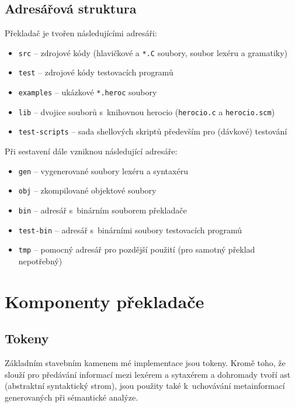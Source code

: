 \documentclass[a4paper,10pt]{article}
\begin{document}
\subsection{Adresářová struktura}
Překladač je tvořen následujícími adresáři:
\begin{itemize}
 \item \verb|src| -- zdrojové kódy (hlavičkové a \verb|*.C| soubory, soubor lexéru a gramatiky)
 \item \verb|test| -- zdrojové kódy testovacích programů
 \item \verb|examples| -- ukázkové \verb|*.heroc| soubory
 \item \verb|lib| -- dvojice souborů s~knihovnou herocio (\verb|herocio.c| a \verb|herocio.scm|)
 \item \verb|test-scripts| -- sada shellových skriptů především pro (dávkové) testování
\end{itemize}
Při sestavení dále vzniknou následující adresáře:
\begin{itemize}
 \item \verb|gen| -- vygenerované soubory lexéru a syntaxéru
 \item \verb|obj| -- zkompilované objektové soubory
 \item \verb|bin| -- adresář s~binárním souborem překladače
 \item \verb|test-bin| -- adresář s~binárními soubory testovacích programů
 \item \verb|tmp| -- pomocný adresář pro pozdější použití (pro samotný překlad nepotřebný)
\end{itemize}

\section{Komponenty překladače}
\subsection{Tokeny}
Základním stavebním kamenem mé implementace jsou tokeny. Kromě toho, že slouží pro předávání informací mezi lexérem a sytaxérem a dohromady tvoří ast (abstraktní syntaktický strom), jsou použity také k~uchovávání metainformací generovaných při sémantické analýze. 
\end{document}
